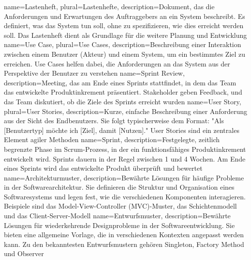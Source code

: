 {
    name={Lastenheft},
    plural={Lastenhefte},
    description={Dokument, das die Anforderungen und Erwartungen des Auftraggebers an ein System beschreibt. Es definiert, was das System tun soll, ohne zu spezifizieren, wie dies erreicht werden soll. Das Lastenheft dient als Grundlage für die weitere Planung und Entwicklung}
}
{
    name={Use Case},
    plural={Use Cases},
    description={Beschreibung einer Interaktion zwischen einem Benutzer (Akteur) und einem System, um ein bestimmtes Ziel zu erreichen. Use Cases helfen dabei, die Anforderungen an das System aus der Perspektive der Benutzer zu verstehen}
}
{
    name={Sprint Review},
    description={Meeting, das am Ende eines Sprints stattfindet, in dem das Team das entwickelte Produktinkrement präsentiert. Stakeholder geben Feedback, und das Team diskutiert, ob die Ziele des Sprints erreicht wurden}
}
{
    name={User Story},
    plural={User Stories},
    description={Kurze, einfache Beschreibung einer Anforderung aus der Sicht des Endbenutzers. Sie folgt typischerweise dem Format: "Als [Benutzertyp] möchte ich [Ziel], damit [Nutzen]." User Stories sind ein zentrales Element agiler Methoden}
}
{
    name={Sprint},
    description={Festgelegte, zeitlich begrenzte Phase im Scrum-Prozess, in der ein funktionsfähiges Produktinkrement entwickelt wird. Sprints dauern in der Regel zwischen 1 und 4 Wochen. Am Ende eines Sprints wird das entwickelte Produkt überprüft und bewertet}
}
{
    name={Architekturmuster},
    description={Bewährte Lösungen für häufige Probleme in der Softwarearchitektur. Sie definieren die Struktur und Organisation eines Softwaresystems und legen fest, wie die verschiedenen Komponenten interagieren. Beispiele sind das Model-View-Controller (MVC)-Muster, das Schichtenmodell und das Client-Server-Modell}
}
{
    name={Entwurfsmuster},
    description={Bewährte Lösungen für wiederkehrende Designprobleme in der Softwareentwicklung. Sie bieten eine allgemeine Vorlage, die in verschiedenen Kontexten angepasst werden kann. Zu den bekanntesten Entwurfsmustern gehören Singleton, Factory Method und Observer}
}
